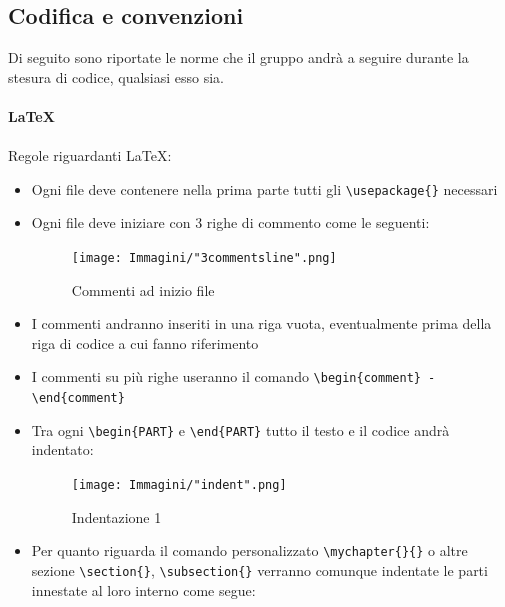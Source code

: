\documentclass[a4paper]{report}
\newcommand{\mychapter}[2]{
    \setcounter{chapter}{#1}
    \setcounter{section}{0}
    \setcounter{subsection}{1}
    \chapter*{#2}
    \addcontentsline{toc}{chapter}{#2}
}
\begin{document}
			\subsection{Codifica e convenzioni}
				Di seguito sono riportate le norme che il gruppo andrà a seguire durante la stesura di codice, qualsiasi esso sia.
				\\ \\
				\textbf{\LaTeX} \\ \\ 
				Regole riguardanti \LaTeX :
				\begin{itemize}
					\item Ogni file deve contenere nella prima parte tutti gli \verb|\usepackage{}| necessari
					\item Ogni file deve iniziare con 3 righe di commento come le seguenti:
					\begin{figure}[h!]
						\centering
						\texttt{[image: Immagini/"3commentsline".png]}
						\caption{Commenti ad inizio file}
					\end{figure}
					\item I commenti andranno inseriti in una riga vuota, eventualmente prima della riga di codice a cui fanno riferimento
					\item I commenti su più righe useranno il comando \verb|\begin{comment} - \end{comment}|
					\item Tra ogni \verb|\begin{PART}| e \verb|\end{PART}| tutto il testo e il codice andrà indentato:
					\begin{figure}[h!]
						\centering
						\texttt{[image: Immagini/"indent".png]}
						\caption{Indentazione 1}
					\end{figure}
					\item Per quanto riguarda il comando personalizzato \verb|\mychapter{}{}| o altre sezione \verb|\section{}|, \verb|\subsection{}| 
					verranno comunque indentate le parti innestate al loro interno come segue:
					\begin{figure}[h!]
						\centering

\end{figure}
\end{itemize}
\end{document}
